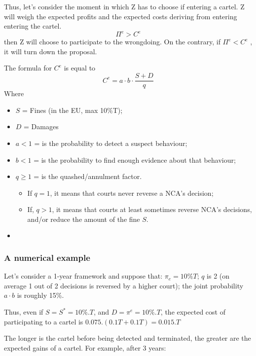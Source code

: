         Thus, let’s consider the moment in which Z has to choose if entering a cartel. Z will weigh the expected profits and the expected costs deriving from entering entering the cartel.
        \[ \Pi^e > C^e \]
        then Z will choose to participate to the wrongdoing. On the contrary, if \( \Pi^e< C^e\) , it will turn down the proposal.

\newpage
        The formula for $C^e$ is equal to
        \begin{equation}
            C^e = a \cdot b \cdot \frac{S+D}{q}
        \end{equation}
        Where
        \begin{itemize}
            \item $S$ = Fines (in the EU, max 10\%T);
            \item $D$ = Damages
            \item $a < 1$ = is the probability to detect a suspect behaviour;
            \item $b < 1$ = is the probability to find enough evidence about that behaviour;
            \item $q \geq 1$ = is the quashed/annulment factor.
                \begin{itemize}
                    \item If \( q = 1 \), it means that courts never reverse a NCA’s decision;
                    \item If, \(q > 1\), it means that courts at least sometimes reverse NCA’s decisions, and/or reduce the amount of the fine $S$.
                \end{itemize}
            \item 
        \end{itemize}

        \subsubsection{A numerical example}

        Let's consider a 1-year framework and suppose that: $\pi_e = 10\%T$; $q$ is 2 (on average 1 out of 2 decisions is reversed by a higher court); the joint probability \(a \cdot b\) is roughly 15\%.

        Thus, even if $S = S^* = 10\%.T$, and $D = \pi^e = 10\%.T$,
        the expected cost of participating to a cartel is $0.075.(0.1T+0.1T) = 0.015.T$
        
        The longer is the cartel before being detected and terminated, the greater are the
        expected gains of a cartel. For example, after 3 years:
        
